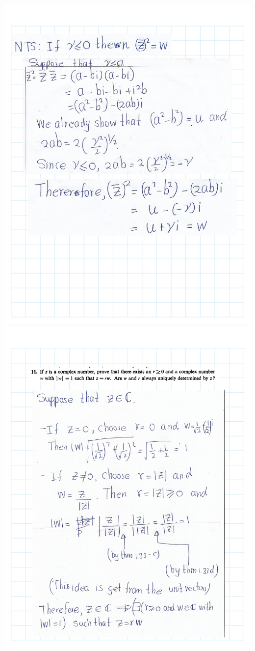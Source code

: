 \documentclass[
]{book}
\theoremstyle{definition}
\theoremstyle{definition}
\theoremstyle{definition}
\theoremstyle{definition}
\theoremstyle{remark}
\begin{document}
\includegraphics{Figures/Ex-1/Rudin-Ex (20).png}
\includegraphics{Figures/Ex-1/Rudin-Ex (21).png}
\end{document}
